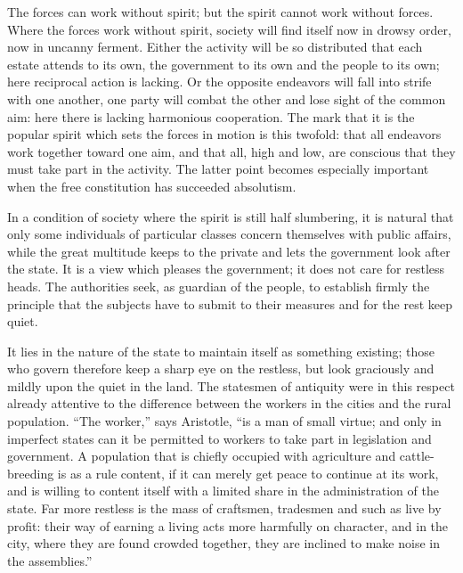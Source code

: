 \documentclass[12pt,a4paper,openany]{book}
\newcommand{\opage}[1]{\marginnote{\footnotesize\textit{[#1]}}}
\begin{document}
The forces can work without spirit; but the spirit
cannot work without forces. Where the forces work
without spirit, society will find itself now in drowsy
order, now in uncanny ferment. Either the activity will
be so distributed that each estate attends to
its own, the government to its own and the people to its own; here reciprocal action is lacking.
Or the opposite endeavors will fall
\setcounter{footnote}{0}%
\opage{62}into strife with one another, one party will combat the
other and lose sight of the common aim: here there is lacking
harmonious cooperation. The mark that it is
the popular spirit which sets the forces in motion is this
twofold: that all endeavors work together toward one
aim, and that all, high and low, are conscious that
they must take part in the activity. The latter point
becomes especially important when the free constitution has
succeeded absolutism.

In a condition of society where the spirit is still
half slumbering, it is natural that only some
individuals of particular classes concern themselves with public
affairs, while the great multitude keeps to
the private and lets the government look after the state. It
is a view which pleases the government; it does
not care for restless heads. The authorities seek, as
guardian of the people, to establish firmly the principle that
the subjects have to submit to their measures
and for the rest keep quiet.

It lies in the nature of the state to maintain itself as
something existing; those who govern therefore keep a sharp
eye on the restless, but look graciously and mildly
upon the quiet in the land. The statesmen of antiquity were
in this respect already attentive to the difference
between the workers in the cities and the rural population.
``The worker,'' says Aristotle, ``is a man
of small virtue; and only in imperfect states can it be
permitted to workers to take part in legislation and government.
A population that is chiefly occupied
with agriculture and cattle-breeding is as a rule content,
if it can merely get peace to continue at its work,
and is willing to content itself with a limited share in
\setcounter{footnote}{0}%
\opage{63}the administration of the state. Far more restless is the mass of craftsmen,
tradesmen and such as live by profit:
their way of earning a living acts more harmfully on
character, and in the city, where they are found crowded together,
they are inclined to make noise in the assemblies.''
\end{document}
